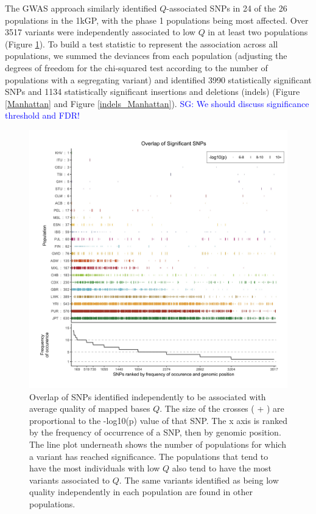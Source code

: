 \documentclass[9pt,lineno]{elife}
\newcommand{\sgcomment}[1]{\textcolor{blue}{SG: #1}}
\begin{document}
The GWAS approach similarly identified $Q$-associated SNPs in 24 of the 26 populations in the 1kGP, with the phase 1 populations being most affected.
Over 3517 variants were independently associated to low $Q$ in at least two populations  (Figure \ref{OverLap}). To build a test statistic to represent the association across all populations, we summed the deviances from each population (adjusting the degrees of freedom for the chi-squared test according to the number of populations with a segregating variant) and identified 3990 statistically significant SNPs and 1134 statistically significant insertions and deletions (indels) (Figure \ref{Manhattan} and Figure \ref{indels_Manhattan}). \sgcomment{We should discuss significance threshold and FDR!}


\begin{figure}
\includegraphics[width=\hsize,keepaspectratio]{./Figures/SNPOverlap6.jpg}

\caption{Overlap of SNPs identified independently to be associated with average quality of mapped bases $Q$. 
The size of the crosses ( + ) are proportional to the -log10(p) value of that SNP.
The x axis is ranked by the frequency of occurrence of a SNP, then by genomic position.
The line plot underneath shows the number of populations for which a variant has reached significance.
The populations that tend to have the most individuals with low $Q$ also tend to have the most variants associated to $Q$. 
The same variants identified as being low quality independently in each population are found in other populations. }
  \label{OverLap}
\end{figure}
\end{document}
